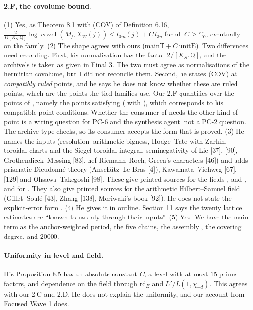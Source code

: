 \documentclass[11pt]{article}
\theoremstyle{remark}
\begin{document}
\paragraph{2.F, the covolume bound.} (1) Yes, as Theorem 8.1 with (COV) of Definition 6.16, $\frac{2}{D[K_S:\mathbb Q]}\log\operatorname{covol}(M_j,X_W(j))\le l_{3m}(j)+C\,l_{3u}$ for all $C\ge C_0$, eventually on the family. (2) The shape agrees with ours ($\mathrm{mainT}+C\,\mathrm{unitE}$). Two differences need recording. First, his normalisation has the factor $2/[K_S:\mathbb Q]$, and the archive's  is taken as given in Final 3. The two must agree as normalisations of the hermitian covolume, but I did not reconcile them. Second, he states (COV) at \emph{compatibly ruled} points, and he says he does not know whether these are ruled points, which are the points the tied families use. Our 2.F quantifies over the points of , namely the points satisfying  ( with ), which corresponds to his compatible point conditions. Whether the consumer of  needs the other kind of point is a wiring question for PC-6 and the synthesis agent, not a PC-2 question. The archive type-checks, so its consumer accepts the form that is proved. (3) He names the inputs (resolution, arithmetic bigness, Hodge--Tate with Zarhin, toroidal charts and the Siegel toroidal integral, seminegativity of Lie [37], [90], Grothendieck--Messing [83], nef Riemann--Roch, Green's characters [46]) and adds prismatic Dieudonné theory (Anschütz--Le Bras [4]), Kawamata--Viehweg [67], [129] and Ohsawa--Takegoshi [98]. These give printed sources for the fields ,  and , and for . They also give printed sources for the arithmetic Hilbert--Samuel field  (Gillet--Soulé [43], Zhang [138], Moriwaki's book [92]). He does not state the explicit-error form . (4) He gives it in outline. Section 11 says the twenty lattice estimates are ``known to us only through their inputs''. (5) Yes. We have the main term as the anchor-weighted period, the five chains, the assembly , the covering degree, and $20000$.

\paragraph{Uniformity in level and field.} His Proposition 8.5 has an absolute constant $C$, a level with at most $15$ prime factors, and dependence on the field through $\mathrm{rd}_E$ and $L'/L(1,\chi_{-d})$. This agrees with our 2.C and 2.D. He does not explain the uniformity, and our account from Focused Wave 1 does.
\end{document}
